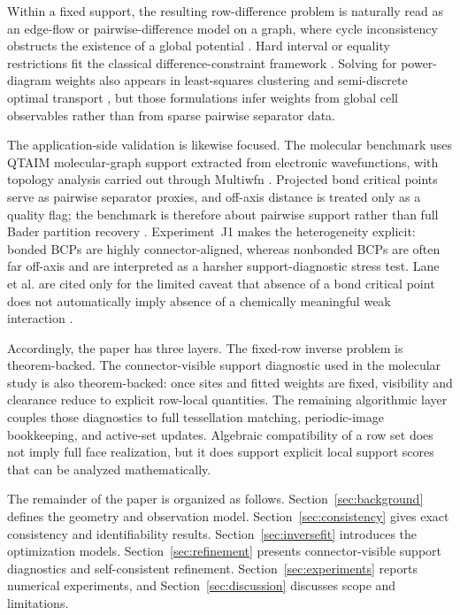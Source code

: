 \documentclass[preprint,12pt]{elsarticle}
\begin{document}
Within a fixed support, the resulting row-difference problem is naturally read
as an edge-flow or pairwise-difference model on a graph, where cycle
inconsistency obstructs the existence of a global potential
\cite{Jiang2011}. Hard interval or equality restrictions fit the classical
difference-constraint framework \cite{Bellman1958}. Solving for power-diagram
weights also appears in least-squares clustering and semi-discrete optimal
transport \cite{AurenhammerHoffmannAronov1998,KitagawaMerigotThibert2019}, but
those formulations infer weights from global cell observables rather than from
sparse pairwise separator data.

The application-side validation is likewise focused. The molecular benchmark
uses QTAIM molecular-graph support extracted from electronic wavefunctions,
with topology analysis carried out through Multiwfn
\cite{LuChen2012,Lu2024Multiwfn}. Projected bond critical points serve as
pairwise separator proxies, and off-axis distance is treated only as a quality
flag; the benchmark is therefore about pairwise support rather than full Bader
partition recovery \cite{Bader1990}. Experiment~J1 makes the heterogeneity
explicit: bonded BCPs are highly connector-aligned, whereas nonbonded BCPs are
often far off-axis and are interpreted as a harsher support-diagnostic stress
test. Lane et al. are cited only for the limited caveat that absence of a bond
critical point does not automatically imply absence of a chemically meaningful
weak interaction \cite{Lane2013}.

Accordingly, the paper has three layers. The fixed-row inverse problem is
theorem-backed. The connector-visible support diagnostic used in the molecular
study is also theorem-backed: once sites and fitted weights are fixed,
visibility and clearance reduce to explicit row-local quantities. The remaining
algorithmic layer couples those diagnostics to full tessellation matching,
periodic-image bookkeeping, and active-set updates. Algebraic compatibility of
a row set does not imply full face realization, but it does support explicit
local support scores that can be analyzed mathematically.

The remainder of the paper is organized as follows.
Section~\ref{sec:background} defines the geometry and observation model.
Section~\ref{sec:consistency} gives exact consistency and identifiability
results. Section~\ref{sec:inversefit} introduces the optimization models.
Section~\ref{sec:refinement} presents connector-visible support diagnostics and
self-consistent refinement. Section~\ref{sec:experiments} reports numerical
experiments, and Section~\ref{sec:discussion} discusses scope and limitations.
\end{document}
